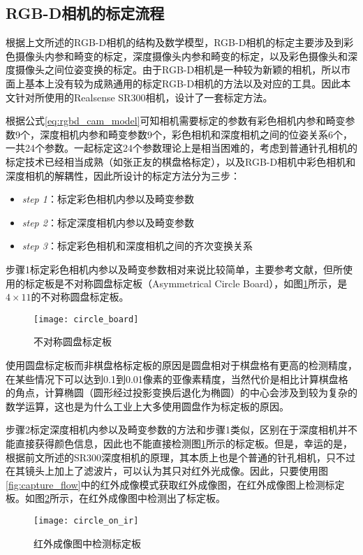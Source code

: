 \subsection{RGB-D相机的标定流程}
\label{sec:rgb-d_calibration}
根据上文所述的RGB-D相机的结构及数学模型，RGB-D相机的标定主要涉及到彩色摄像头内参和畸变的标定，深度摄像头内参和畸变的标定，以及彩色摄像头和深度摄像头之间位姿变换的标定。由于RGB-D相机是一种较为新颖的相机，所以市面上基本上没有较为成熟通用的标定RGB-D相机的方法以及对应的工具。因此本文针对所使用的Realsense SR300相机，设计了一套标定方法。

根据公式\ref{eq:rgbd_cam_model}可知相机需要标定的参数有彩色相机内参和畸变参数9个，深度相机内参和畸变参数9个，彩色相机和深度相机之间的位姿关系6个，一共24个参数。一起标定这24个参数理论上是相当困难的，考虑到普通针孔相机的标定技术已经相当成熟（如张正友的棋盘格标定\cite{Zhang2002}），以及RGB-D相机中彩色相机和深度相机的解耦性，因此所设计的标定方法分为三步：
\begin{itemize}
\item \emph{step 1}：标定彩色相机内参以及畸变参数
\item \emph{step 2}：标定深度相机内参以及畸变参数
\item \emph{step 3}：标定彩色相机和深度相机之间的齐次变换关系
\end{itemize}

步骤1标定彩色相机内参以及畸变参数相对来说比较简单，主要参考文献\cite{Zhang2002}，但所使用的标定板是不对称圆盘标定板（Asymmetrical Circle Board），如图\ref{fig:circle_board}所示，是$4\times 11$的不对称圆盘标定板。
\begin{figure}[!ht]
  \centering
  \texttt{[image: circle\_board]}
  \caption{不对称圆盘标定板}
  \label{fig:circle_board}
\end{figure}
使用圆盘标定板而非棋盘格标定板的原因是圆盘相对于棋盘格有更高的检测精度，在某些情况下可以达到0.1到0.01像素的亚像素精度，当然代价是相比计算棋盘格的角点，计算椭圆（圆形经过投影变换后退化为椭圆）的中心会涉及到较为复杂的数学运算，这也是为什么工业上大多使用圆盘作为标定板的原因。

步骤2标定深度相机内参以及畸变参数的方法和步骤1类似，区别在于深度相机并不能直接获得颜色信息，因此也不能直接检测图\ref{fig:circle_board}所示的标定板。但是，幸运的是，根据前文所述的SR300深度相机的原理，其本质上也是个普通的针孔相机，只不过在其镜头上加上了滤波片，可以认为其只对红外光成像。因此，只要使用图\ref{fig:capture_flow}中的红外成像模式获取红外成像图，在红外成像图上检测标定板。如图\ref{fig:circle_on_ir}所示，在红外成像图中检测出了标定板。
\begin{figure}[!ht]
  \centering
  \texttt{[image: circle\_on\_ir]}
  \caption{红外成像图中检测标定板}
  \label{fig:circle_on_ir}
\end{figure}

